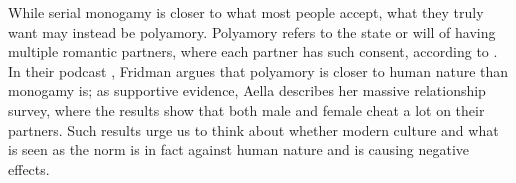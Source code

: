 \documentclass[12pt]{article}
\begin{document}
While serial monogamy is closer to what most people accept,
what they truly want may instead be polyamory.
Polyamory refers to the state or will of having multiple romantic partners,
where each partner has such consent, according to \cite{wikipedia2023polyamory}.
In their podcast \citep{fridman2023aella},
Fridman argues that polyamory is closer to human nature than monogamy is;
as supportive evidence, Aella describes her massive relationship survey,
where the results show that both male and female cheat a lot on their partners.
Such results urge us to think about whether modern culture and what is seen as
the norm is in fact against human nature and is causing negative effects.

\citep{schwitzgebel2008thoughts}

\citep{malinowska2022love}
\pagebreak


\end{document}
